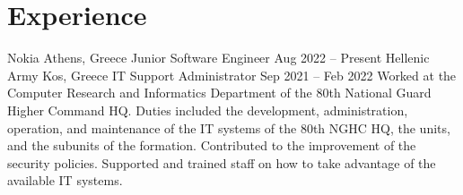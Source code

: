 \section{Experience}

\begin{cventries}
    \cventryiv
        {Nokia}
        {Athens, Greece}
        {Junior Software Engineer}
        {Aug 2022 -- Present}
    \cventryiv
        {Hellenic Army}
        {Kos, Greece}
        {IT Support Administrator}
        {Sep 2021 -- Feb 2022}
    \cventryi
        {Worked at the Computer Research and Informatics Department of the 80th National Guard Higher Command HQ. Duties included the development, administration, operation, and maintenance of the IT systems of the 80th NGHC HQ, the units, and the subunits of the formation. Contributed to the improvement of the security policies. Supported and trained staff on how to take advantage of the available IT systems.}
\end{cventries}
